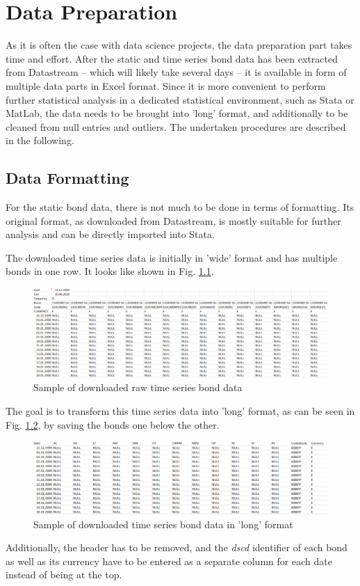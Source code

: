 \chapter{Data Preparation}  \label{chapter:data-preparation}
As it is often the case with data science projects, the data preparation part takes time and effort. After the static and time series bond data has been extracted from Datastream -- which will likely take several days -- it is available in form of multiple data parts in Excel format. Since it is more convenient to perform further statistical analysis in a dedicated statistical environment, such as Stata or MatLab, the data needs to be brought into 'long' format, and additionally to be cleaned from null entries and outliers. The undertaken procedures are described in the following. 

\section{Data Formatting}  \label{section:data-formatting}
For the static bond data, there is not much to be done in terms of formatting. Its original format, as downloaded from Datastream, is mostly suitable for further analysis and can be directly imported into Stata. 

The downloaded time series data is initially in 'wide' format and has multiple bonds in one row. It looks like shown in Fig. \ref{fig:original-excel-ts-data}. 

\begin{figure}[h]
	\centering
	\includegraphics[width=1.0\linewidth]{figures/original-excel-ts-data}
	\caption{Sample of downloaded raw time series bond data}
	\label{fig:original-excel-ts-data}
\end{figure}

The goal is to transform this time series data into 'long' format, as can be seen in Fig. \ref{fig:long-format-excel-ts-data}, by saving the bonds one below the other. 
\begin{figure}[h]
	\centering
	\includegraphics[width=1.0\linewidth]{figures/long-format-excel-ts-data}
	\caption{Sample of downloaded time series bond data in 'long' format}
	\label{fig:long-format-excel-ts-data}
\end{figure}
Additionally, the header has to be removed, and the \textit{dscd} identifier of each bond as well as its currency have to be entered as a separate column for each date instead of being at the top. 

